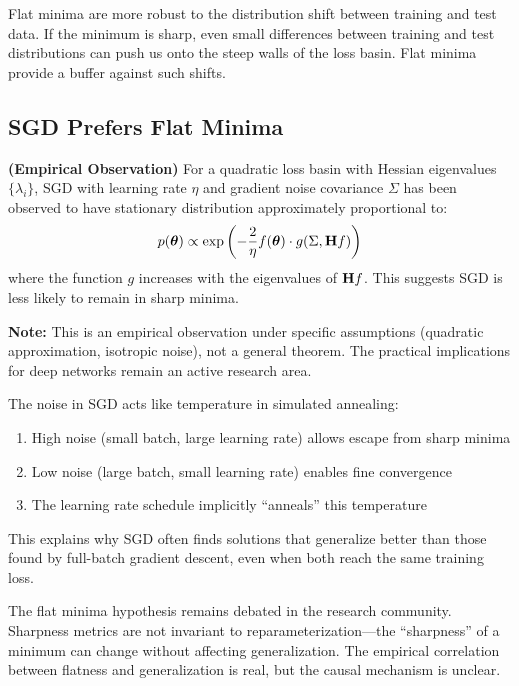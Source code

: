 \documentclass[../../main.tex]{subfiles}
\begin{document}
\begin{intuition}
Flat minima are more robust to the distribution shift between training and test data. If the minimum is sharp, even small differences between training and test distributions can push us onto the steep walls of the loss basin. Flat minima provide a buffer against such shifts.
\end{intuition}

\subsection{SGD Prefers Flat Minima}

\begin{principle}[title={SGD's Preference for Flat Minima}]
\textbf{(Empirical Observation)} For a quadratic loss basin with Hessian eigenvalues $\{\lambda_i\}$, SGD with learning rate $\eta$ and gradient noise covariance $\Sigma$ has been observed to have stationary distribution approximately proportional to:
\[
    p(\boldsymbol{\theta}) \propto \exp\left(-\frac{2}{\eta} f(\boldsymbol{\theta}) \cdot g(\Sigma, \mathbf{H} f)\right)
\]
where the function $g$ increases with the eigenvalues of $\mathbf{H} f$. This suggests SGD is less likely to remain in sharp minima.

\textbf{Note:} This is an empirical observation under specific assumptions (quadratic approximation, isotropic noise), not a general theorem. The practical implications for deep networks remain an active research area.
\end{principle}

\begin{keyconcept}
The noise in SGD acts like temperature in simulated annealing:
\begin{enumerate}
    \item High noise (small batch, large learning rate) allows escape from sharp minima
    \item Low noise (large batch, small learning rate) enables fine convergence
    \item The learning rate schedule implicitly ``anneals'' this temperature
\end{enumerate}
This explains why SGD often finds solutions that generalize better than those found by full-batch gradient descent, even when both reach the same training loss.
\end{keyconcept}

\begin{important}
The flat minima hypothesis remains debated in the research community. Sharpness metrics are not invariant to reparameterization---the ``sharpness'' of a minimum can change without affecting generalization. The empirical correlation between flatness and generalization is real, but the causal mechanism is unclear.
\end{important}
\end{document}
